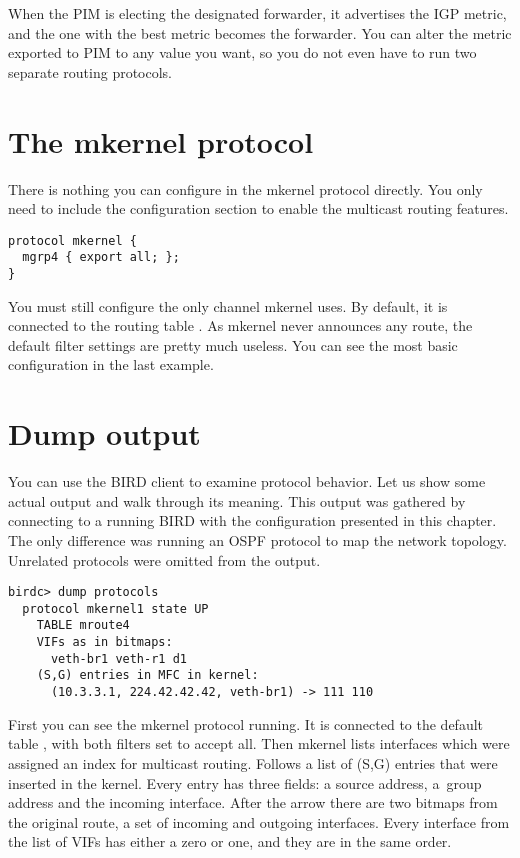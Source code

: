 When the PIM is electing the designated forwarder, it advertises the IGP metric, and
the one with the best metric becomes the forwarder. You can alter the metric
exported to PIM to any value you want, so you do not even have to run two
separate routing protocols.

\section{The mkernel protocol}

There is nothing you can configure in the mkernel protocol directly. You only
need to include the configuration section to enable the multicast routing
features.

\begin{lstlisting}
protocol mkernel {
  mgrp4 { export all; };
}
\end{lstlisting}

\noindent You must still configure the only channel mkernel uses. By default, it
is connected to the routing table . As mkernel never announces any
route, the default filter settings are pretty much useless. You can see the
most basic configuration in the last example.

\section{Dump output}
You can use the BIRD client to examine protocol behavior. Let us show some
actual output and walk through its meaning. This output was gathered by
connecting to a running BIRD with the configuration presented in this chapter.
The only difference was running an OSPF protocol to map the network topology.
Unrelated protocols were omitted from the output.

\begin{lstlisting}
birdc> dump protocols
  protocol mkernel1 state UP
    TABLE mroute4
    VIFs as in bitmaps:
      veth-br1 veth-r1 d1
    (S,G) entries in MFC in kernel:
      (10.3.3.1, 224.42.42.42, veth-br1) -> 111 110
\end{lstlisting}

\noindent First you can see the mkernel protocol running. It is connected to the default
table , with both filters set to accept all. Then mkernel lists
interfaces which were assigned an index for multicast routing. Follows a list
of (S,G) entries that were inserted in the kernel. Every entry has three
fields: a source address, a~group address and the incoming interface. After the
arrow there are two bitmaps from the original route, a set of incoming and
outgoing interfaces. Every interface from the list of VIFs has either a zero or
one, and they are in the same order.

